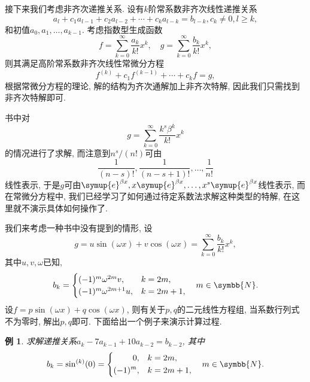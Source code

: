 \documentclass[chinese]{assignment}[2019/10/15]
\newcommand{\me}{\symup{e}}
\newcommand{\BN}{\symbb{N}}
\newcommand{\lr}[3]{\left#1#3\right#2}
\theoremstyle{plain}
\newtheorem{example}[theorem]{例}
\begin{document}
    接下来我们考虑非齐次递推关系. 设有$k$阶常系数非齐次线性递推关系
    \begin{equation}
        a_{l} + c_1a_{l-1}+c_2a_{l-2}+ \dotsb + c_ka_{l-k} = b_{l-k}, c_k\neq 0, l\geq k,
    \end{equation}
    和初值$a_0, a_1, \dotsc, a_{k-1}$. 考虑指数型生成函数
    \begin{equation}
        f = \sum_{k=0}^\infty \frac{a_k}{k!}x^k, \quad g = \sum_{k=0}^\infty \frac{b_k}{k!}x^k,
    \end{equation}
    则其满足高阶常系数非齐次线性常微分方程
    \begin{equation}
        f^{(k)}+c_1f^{(k-1)}+\dotsb+c_kf = g,
    \end{equation}
    根据常微分方程的理论, 解的结构为齐次通解加上非齐次特解, 因此我们只需找到非齐次特解即可.

    书中对
    \begin{equation}
        g=\sum_{k=0}^\infty \frac{k^s\beta^k}{k!}x^k
    \end{equation}
    的情况进行了求解, 而注意到$n^s/(n!)$可由
    \begin{equation}
        \frac{1}{(n-s)!}, \frac{1}{(n-s+1)!}, \dotsc, \frac{1}{n!}
    \end{equation}
    线性表示, 于是$g$可由$\me^{\beta x}, x\me^{\beta x}, \dotsc, x^s\me^{\beta x}$线性表示, 而在常微分方程中, 我们已经学习了如何通过待定系数法求解这种类型的特解, 在这里就不演示具体如何操作了.

    我们来考虑一种书中没有提到的情形, 设
    \begin{equation}
        g = u\sin(\omega x) + v\cos(\omega x) = \sum_{k=0}^\infty \frac{b_k}{k!}x^k,
    \end{equation}
    其中$u, v, \omega$已知,
    \begin{equation}
        b_k =
        \begin{cases}
            (-1)^m \omega^{2m}v, &k = 2m,\\
            (-1)^m \omega^{2m+1}u, &k = 2m+1,
        \end{cases}
        \quad m\in \BN.
    \end{equation}
    设$f = p\sin(\omega x) + q\cos(\omega x)$, 则有关于$p, q$的二元线性方程组, 当系数行列式不为零时, 解出$p, q$即可. 下面给出一个例子来演示计算过程.

    \begin{example}
        求解递推关系$a_k-7a_{k-1}+10a_{k-2}=b_{k-2}$, 其中
        \begin{equation}
            b_k = \sin^{(k)}(0) =
            \lr\{.{
                \begin{aligned}
                    0, &\quad k=2m,\\
                    (-1)^m, &\quad k=2m+1,
                \end{aligned}
            }
            \quad m\in\BN.
        \end{equation}
    \end{example}
\end{document}
